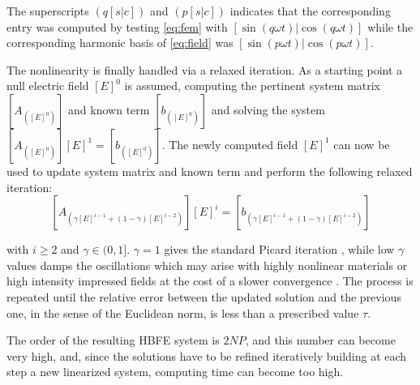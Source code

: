 \documentclass[journal]{IEEEtran}
\begin{document}
\noindent The superscripts $(q[s|c])$ and $(p[s|c])$ indicates that the corresponding
entry was computed by testing \eqref{eq:fem} with $[\sin(q \omega t) | \cos(q \omega t)]$ 
while the corresponding harmonic basis of \eqref{eq:field}
was $[\sin(p \omega t) | \cos(p \omega t)]$.

The nonlinearity is finally handled via a
relaxed iteration. As a starting point a null electric field $[E]^0$ is assumed,
computing the pertinent system matrix $[A_{([E]^0)}]$ and
known term $[b_{([E]^0)}]$ and solving the system $[A_{([E]^0)}] [E]^1 =
[b_{([E]^0)}]$. The newly computed field $[E]^1$ can now be used to update system
matrix and known term and perform the following relaxed iteration:
\begin{equation} \label{eq:lastLinearSystem}
 [A_{(\gamma [E]^{i-1} + (1-\gamma) [E]^{i-2})}] [E]^{i} = [b_{(\gamma [E]^{i-1}
 + (1-\gamma) [E]^{i-2})}]
\end{equation}
% 

\noindent with $i \geq 2$ and
$\gamma\in(0,1]$. $\gamma=1$ gives the standard Picard iteration
\cite{Guarnieri2010}, while low $\gamma$ values damps the oscillations
which may arise with highly nonlinear materials or high intensity impressed
fields at the cost of a slower convergence \cite{Silvester1997}. The process 
is repeated until the relative error between the updated solution
and the previous one, in the sense of the Euclidean norm, is less than a
prescribed value $\tau$.

The order of the resulting HBFE system is $2 N P$, and
this number can become very high, and, since the
solutions have to be refined iteratively building at each step a new linearized
system, computing time can become too high. 
\end{document}
